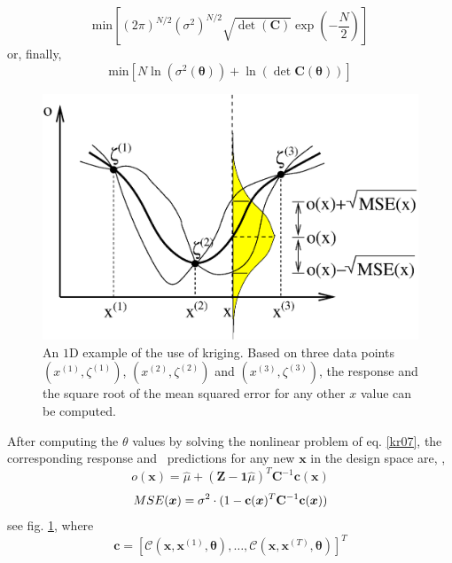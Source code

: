 \documentclass{vki_ls}
\newcommand{\vect}[1]{\bm{#1}}
\newcommand{\set}[1]{\mathcal{#1}}
\newcommand{\CBF}{\mathbf{C}}
\newcommand{\onebf}{\mathbf{1}}
\newcommand{\cbf}{\mathbf{c}}
\begin{document}
%
\begin{equation}
    \mbox{min} \left[ (2\pi)^{N/2} (\sigma^2)^{N/2} 
		      \sqrt{\det(\CBF)} \exp(-\frac{N}{2}) \right]
    \nonumber
\end{equation}
%
or, finally,
%
\begin{equation}
   \mbox{min} \left[ N \ln \left( \sigma^2 (\vect{\theta}) \right) + 
                       \ln \left( \det \CBF(\vect{\theta}) \right)
              \right]
   \label{kr07}
\end{equation}
%
\begin{figure}
  \centering
  \includegraphics[scale=0.5]{krig}
  \caption{An $1$D example of the use of kriging. Based on three data points 
	   $(x^{(1)},\zeta^{(1)})$, $(x^{(2)},\zeta^{(2)})$ and 
	   $(x^{(3)},\zeta^{(3)})$, the response and the square root of the 
	   mean squared error for any other $x$ value can be computed.}
  \label{f:krig}
\end{figure}

After computing the $\theta$ values by solving the nonlinear problem of eq. \ref{kr07}, the corresponding response and \MSE\ predictions for any new $\vect x$ in the design space are, \cite{LTT_2_027},
%
\begin{equation}
   o(\vect{x})= \hat{\mu} + (\vect{Z} - \onebf \hat{\mu})^T \CBF^{-1} \cbf(\vect{x})
   \label{kr08}
\end{equation}
%
\begin{equation}
   \MSE(\vect{x}) = \sigma^2 \cdot (1-\cbf(\vect{x})^T\CBF^{-1}\cbf(\vect{x}))
   \label{kr09}
\end{equation}
%
see fig. \ref{f:krig}, where
%
\begin{equation}
   \cbf = \left[
   \set{C} \left(\vect{x}, \vect{x}^{(1)},\vect{\theta} \right),  \dots,
   \set{C} \left(\vect{x}, \vect{x}^{(T)},\vect{\theta} \right) \right]^T
   \label{kr10}
\end{equation}
\end{document}
